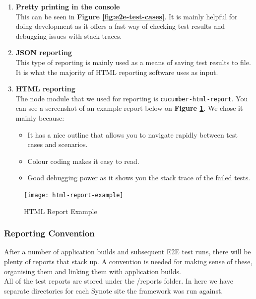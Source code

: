 \begin{enumerate}

\item \textbf{Pretty printing in the console}
\\
This can be seen in \textbf{Figure \ref{fig:e2e-test-cases}}. It is mainly helpful for doing development as it offers a fast way of checking test results and debugging issues with stack traces.

\item \textbf{JSON reporting}
\\
This type of reporting is mainly used as a means of saving test results to file. It is what the majority of HTML reporting software uses as input.

\item \textbf{HTML reporting}
\\
The node module that we used for reporting is \texttt{cucumber-html-report}. You can see a screenshot of an example report below on \textbf{Figure \ref{fig:html-report-example}}. We chose it mainly because:

\begin{itemize}
\item It has a nice outline that allows you to navigate rapidly between test cases and scenarios.
\item Colour coding makes it easy to read.
\item Good debugging power as it shows you the stack trace of the failed tests.
\end{itemize}

\end{enumerate}

\begin{figure}[!hbt]
  	\centering
 	\texttt{[image: html-report-example]}
  	\caption{HTML Report Example}
 	\label{fig:html-report-example}
\end{figure}

\subsubsection{Reporting Convention}
\label{subsubsec:reporting-convention}

After a number of application builds and subsequent E2E test runs, there will be plenty of reports that stack up. A convention is needed for making sense of these, organising them and linking them with application builds.
\\

All of the test reports are stored under the /reports folder. In here we have separate directories for each Synote site the framework was run against. 
\\

